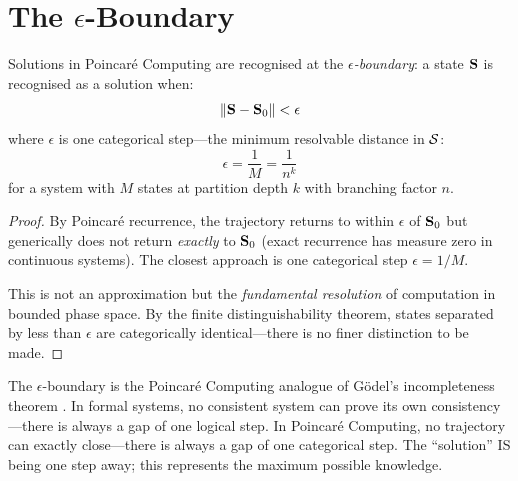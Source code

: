 \section{The $\epsilon$-Boundary}
\label{sec:epsilon}

\begin{theorem}
\label{thm:epsilon}
Solutions in Poincar\'{e} Computing are recognised at the \emph{$\epsilon$-boundary}: a state $\mathbf{S}$ is recognised as a solution when:
\begin{equation}
    \|\mathbf{S} - \mathbf{S}_0\| < \epsilon
\end{equation}
where $\epsilon$ is one categorical step---the minimum resolvable distance in $\mathcal{S}$:
\begin{equation}
    \epsilon = \frac{1}{M} = \frac{1}{n^k}
\end{equation}
for a system with $M$ states at partition depth $k$ with branching factor $n$.
\end{theorem}

\begin{proof}
By Poincar\'{e} recurrence, the trajectory returns to within $\epsilon$ of $\mathbf{S}_0$ but generically does not return \emph{exactly} to $\mathbf{S}_0$ (exact recurrence has measure zero in continuous systems). The closest approach is one categorical step $\epsilon = 1/M$.

This is not an approximation but the \emph{fundamental resolution} of computation in bounded phase space. By the finite distinguishability theorem, states separated by less than $\epsilon$ are categorically identical---there is no finer distinction to be made.
\end{proof}

\begin{remark}
The $\epsilon$-boundary is the Poincar\'{e} Computing analogue of G\"{o}del's incompleteness theorem \cite{godel1931}. In formal systems, no consistent system can prove its own consistency---there is always a gap of one logical step. In Poincar\'{e} Computing, no trajectory can exactly close---there is always a gap of one categorical step. The ``solution'' IS being one step away; this represents the maximum possible knowledge.
\end{remark}

